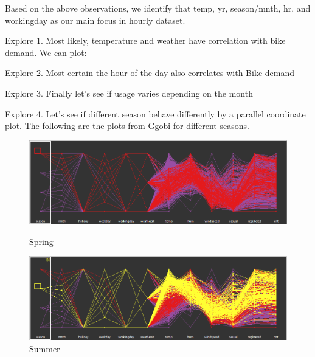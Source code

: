 \documentclass[12pt]{article}
\begin{document}
	Based on the above observations, we identify that temp, yr, season/mnth, hr, and workingday as our main focus in hourly dataset.
	
	Explore 1. Most likely, temperature and weather have correlation with bike demand. We can plot:
	
	Explore 2. Most certain the hour of the day also correlates with Bike demand 
	
	Explore 3. Finally let’s see if usage varies depending on the month 
	
	Explore 4. Let's see if different season behave differently by a parallel coordinate plot. The following are the plots from Ggobi for different seasons.
	
	\begin{figure}[H]
		\centering
		\begin{minipage}{.5\textwidth}
			\centering
			\includegraphics[width=\linewidth]{figures/spring_pcor.png}
			\caption{Spring}
		\end{minipage}%
		\begin{minipage}{.5\textwidth}
			\centering
			\includegraphics[width=\linewidth]{figures/summer_pcor.png}
			\caption{Summer}
		\end{minipage}
	\end{figure}
\end{document}
